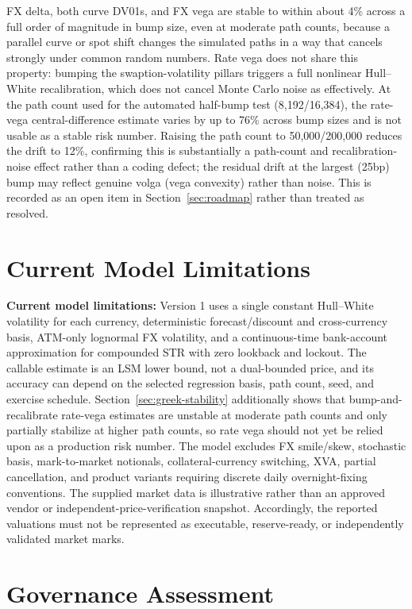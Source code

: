 \documentclass[conference]{IEEEtran}
\begin{document}
FX delta, both curve DV01s, and FX vega are stable to within about 4\% across a full order of magnitude in bump size, even at moderate path counts, because a parallel curve or spot shift changes the simulated paths in a way that cancels strongly under common random numbers. Rate vega does not share this property: bumping the swaption-volatility pillars triggers a full nonlinear Hull--White recalibration, which does not cancel Monte Carlo noise as effectively. At the path count used for the automated half-bump test (8,192/16,384), the rate-vega central-difference estimate varies by up to 76\% across bump sizes and is not usable as a stable risk number. Raising the path count to 50,000/200,000 reduces the drift to 12\%, confirming this is substantially a path-count and recalibration-noise effect rather than a coding defect; the residual drift at the largest (25bp) bump may reflect genuine volga (vega convexity) rather than noise. This is recorded as an open item in Section~\ref{sec:roadmap} rather than treated as resolved.

\section{Current Model Limitations}
\label{sec:limitations}

\textbf{Current model limitations:} Version 1 uses a single constant Hull--White volatility for each currency, deterministic forecast/discount and cross-currency basis, ATM-only lognormal FX volatility, and a continuous-time bank-account approximation for compounded \texteuro STR with zero lookback and lockout. The callable estimate is an LSM lower bound, not a dual-bounded price, and its accuracy can depend on the selected regression basis, path count, seed, and exercise schedule. Section~\ref{sec:greek-stability} additionally shows that bump-and-recalibrate rate-vega estimates are unstable at moderate path counts and only partially stabilize at higher path counts, so rate vega should not yet be relied upon as a production risk number. The model excludes FX smile/skew, stochastic basis, mark-to-market notionals, collateral-currency switching, XVA, partial cancellation, and product variants requiring discrete daily overnight-fixing conventions. The supplied market data is illustrative rather than an approved vendor or independent-price-verification snapshot. Accordingly, the reported valuations must not be represented as executable, reserve-ready, or independently validated market marks.

\section{Governance Assessment}
\end{document}
